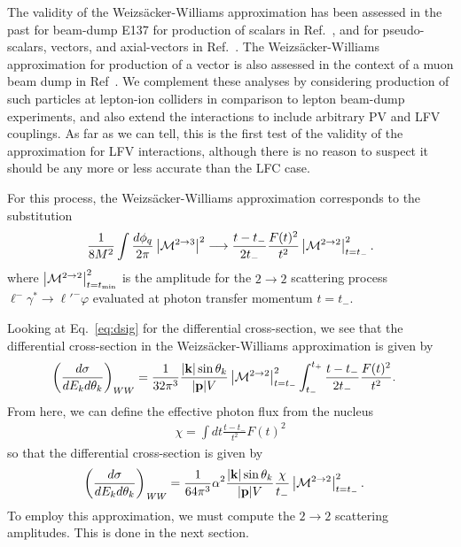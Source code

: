 The validity of the Weizs\"acker-Williams approximation has been assessed in the past for beam-dump E137 for production of scalars in Ref.~\cite{Liu:2016mqv}, and for pseudo-scalars, vectors, and axial-vectors in Ref.~\cite{Liu:2017htz}. The Weizs\"acker-Williams approximation for production of a vector is also assessed in the context of a muon beam dump in Ref~\cite{Chen:2017awl}. We complement these analyses by considering production of such particles at lepton-ion colliders in comparison to lepton beam-dump experiments, and also extend the interactions to include arbitrary PV and LFV couplings. As far as we can tell, this is the first test of the validity of the approximation for LFV interactions, although there is no reason to suspect it should be any more or less accurate than the LFC case.

For this process, the Weizs\"acker-Williams approximation corresponds to the substitution \cite{Kim:1973he}
\begin{align}
    \frac{1}{8M^2}\int{\frac{d\phi_q}{2\pi} \left|{\cal M}^{2\rightarrow 3}\right|^2} \longrightarrow \frac{t - t_{-}}{2t_-}\frac{F(t)^2}{t^2}\left|{\cal M}^{2\rightarrow 2}\right|_{t=t_{-}}^2.\label{eq:WW_sub}
\end{align}
where $\left|{\cal M}^{2\rightarrow 2}\right|_{t=t_{\rm min}}^2$ is the amplitude for the $2 \rightarrow 2$ scattering process $\ell^-\gamma^* \rightarrow \ell'^- \varphi$ evaluated at photon transfer momentum $t = t_-$. 

Looking at Eq.~\ref{eq:dsig} for the differential cross-section, we see that the differential cross-section in the Weizs\"acker-Williams approximation is given by
\begin{align}
    \left(\frac{d\sigma}{dE_kd\theta_k}\right)_{WW} &= \frac{1}{32\pi^3} \frac{|{\bf k}|\sin{\theta_k}}{|{\bf p}|V}\left|{\cal M}^{2\rightarrow 2}\right|^2_{t = t_-}\int_{t_-}^{t_+}\frac{t-t_{-}}{2t_-}\frac{F(t)^2}{t^2}.
\end{align}
From here, we can define the effective photon flux from the nucleus
\begin{align}
    \chi = \int{dt\frac{t-t_{-}}{{t^2}}F(t)^2}
\end{align}
so that the differential cross-section is given by 
\begin{align}
    \left(\frac{d\sigma}{dE_kd\theta_k}\right)_{\it WW} &= \frac{1}{64\pi^3} \alpha^2\frac{|{\bf k}|\sin{\theta_k}}{|{\bf p}|V}\frac{\chi}{t_-}\left|{\cal M}^{2\rightarrow 2}\right|^2_{t = t_-}.
\end{align}
To employ this approximation, we must compute the $2\rightarrow 2$ scattering amplitudes. This is done in the next section. 

